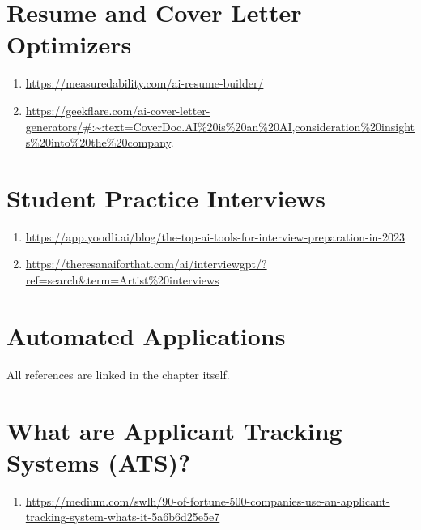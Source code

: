 \documentclass[
]{book}
\providecommand{\tightlist}{%
  \setlength{\itemsep}{0pt}\setlength{\parskip}{0pt}}
\begin{document}
\hypertarget{resume-and-cover-letter-optimizers-1}{%
\section{Resume and Cover Letter Optimizers}\label{resume-and-cover-letter-optimizers-1}}

\begin{enumerate}
\def\labelenumi{\arabic{enumi}.}
\tightlist
\item
  \url{https://measuredability.com/ai-resume-builder/}
\item
  \url{https://geekflare.com/ai-cover-letter-generators/\#:~:text=CoverDoc.AI\%20is\%20an\%20AI,consideration\%20insights\%20into\%20the\%20company}.
\end{enumerate}

\hypertarget{student-practice-interviews-1}{%
\section{Student Practice Interviews}\label{student-practice-interviews-1}}

\begin{enumerate}
\def\labelenumi{\arabic{enumi}.}
\tightlist
\item
  \url{https://app.yoodli.ai/blog/the-top-ai-tools-for-interview-preparation-in-2023}
\item
  \url{https://theresanaiforthat.com/ai/interviewgpt/?ref=search\&term=Artist\%20interviews}
\end{enumerate}

\hypertarget{automated-applications-1}{%
\section{Automated Applications}\label{automated-applications-1}}

All references are linked in the chapter itself.

\hypertarget{what-are-applicant-tracking-systems-ats-1}{%
\section{What are Applicant Tracking Systems (ATS)?}\label{what-are-applicant-tracking-systems-ats-1}}

\begin{enumerate}
\def\labelenumi{\arabic{enumi}.}
\tightlist
\item
  \url{https://medium.com/swlh/90-of-fortune-500-companies-use-an-applicant-tracking-system-whats-it-5a6b6d25e5e7}
\end{enumerate}
\end{document}
